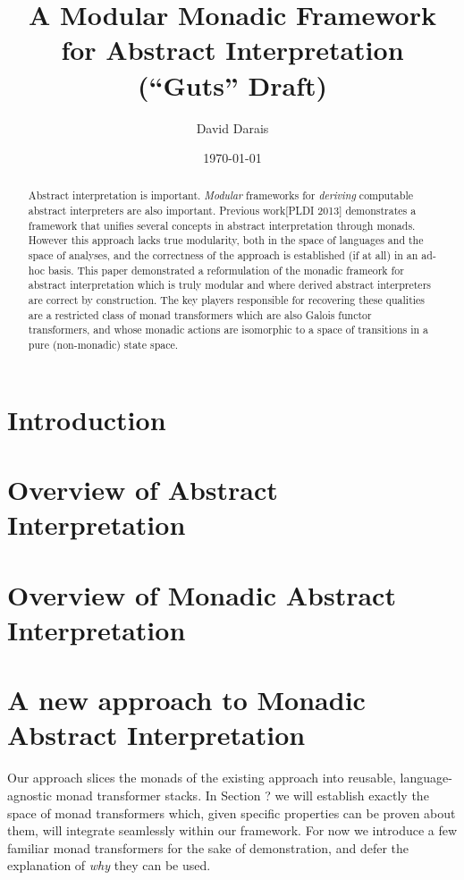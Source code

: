 \documentclass{article}
\title{A Modular Monadic Framework for Abstract Interpretation (``Guts'' Draft)}
\author{David Darais}
\date{\today}
\begin{document}
\maketitle


\begin{abstract}
Abstract interpretation is important.  \textit{Modular} frameworks for
\textit{deriving} computable abstract interpreters are also important. Previous
work[PLDI 2013] demonstrates a framework that unifies several concepts in
abstract interpretation through monads. However this approach lacks true
modularity, both in the space of languages and the space of analyses, and the
correctness of the approach is established (if at all) in an ad-hoc basis. This
paper demonstrated a reformulation of the monadic frameork for abstract
interpretation which is truly modular and where derived abstract interpreters
are correct by construction. The key players responsible for recovering these
qualities are a restricted class of monad transformers which are also Galois
functor transformers, and whose monadic actions are isomorphic to a space of
transitions in a pure (non-monadic) state space.
\end{abstract}


\section{Introduction}


\section{Overview of Abstract Interpretation}


\section{Overview of Monadic Abstract Interpretation}


\section{A new approach to Monadic Abstract Interpretation}
Our approach slices the monads of the existing approach into reusable,
language-agnostic monad transformer stacks.
%
In Section ? we will establish exactly the space of monad transformers which,
given specific properties can be proven about them, will integrate seamlessly
within our framework.  For now we introduce a few familiar monad transformers
for the sake of demonstration, and defer the explanation of \textit{why} they
can be used.
\end{document}
